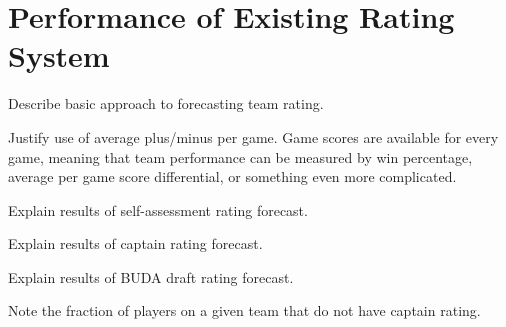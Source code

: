 \section{Performance of Existing Rating System}\label{sec:existing_performance}

Describe basic approach to forecasting team rating.

Justify use of average plus/minus per game. Game scores are available for every game, meaning that team performance can be measured by win percentage, average per game score differential, or something even more complicated.

Explain results of self-assessment rating forecast.

Explain results of captain rating forecast.

Explain results of BUDA draft rating forecast.

Note the fraction of players on a given team that do not have captain rating.